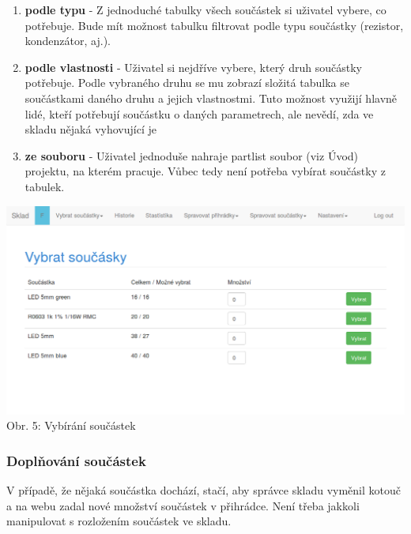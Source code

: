 \documentclass[12pt, a4paper, oneside]{article}
\begin{document}
\begin{enumerate}
\item \textbf{podle typu} - Z jednoduché tabulky všech součástek si uživatel vybere, co potřebuje. Bude mít možnost tabulku filtrovat podle typu součástky (rezistor, kondenzátor, aj.).
\item \textbf{podle vlastnosti} - Uživatel si nejdříve vybere, který druh součástky potřebuje. Podle vybraného druhu se mu zobrazí složitá tabulka se součástkami daného druhu a jejich vlastnostmi. Tuto možnost využijí hlavně lidé, kteří potřebují součástku o daných parametrech, ale nevědí, zda ve skladu nějaká vyhovující je
\item \textbf{ze souboru} - Uživatel jednoduše nahraje partlist soubor (viz Úvod) projektu, na kterém pracuje. Vůbec tedy není potřeba vybírat součástky z tabulek.
\end{enumerate}

\begin{minipage}{\textwidth}
\begin{center}
\hspace*{-2cm}
\includegraphics[scale=0.55]{img/web_vybrat_soucastky.png}
\\
\caption{Obr. 5: Vybírání součástek}
\end{center}
\end{minipage}
\vspace{4mm}

\subsubsection{Doplňování součástek}

V případě, že nějaká součástka dochází, stačí, aby správce skladu vyměnil kotouč a na webu zadal nové množství součástek v přihrádce. Není třeba jakkoli manipulovat s rozložením součástek ve skladu.
\end{document}
